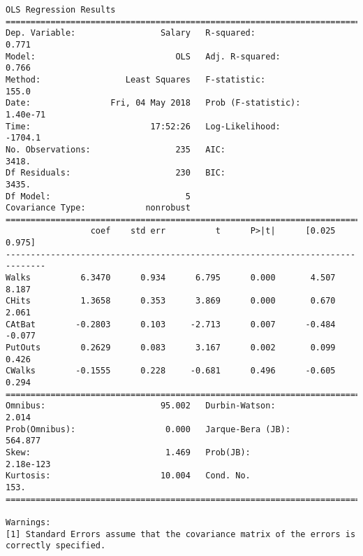 \documentclass[11pt]{article}
\begin{document}
    \begin{Verbatim}[commandchars=\\\{\}]
                            OLS Regression Results                            
==============================================================================
Dep. Variable:                 Salary   R-squared:                       0.771
Model:                            OLS   Adj. R-squared:                  0.766
Method:                 Least Squares   F-statistic:                     155.0
Date:                Fri, 04 May 2018   Prob (F-statistic):           1.40e-71
Time:                        17:52:26   Log-Likelihood:                -1704.1
No. Observations:                 235   AIC:                             3418.
Df Residuals:                     230   BIC:                             3435.
Df Model:                           5                                         
Covariance Type:            nonrobust                                         
==============================================================================
                 coef    std err          t      P>|t|      [0.025      0.975]
------------------------------------------------------------------------------
Walks          6.3470      0.934      6.795      0.000       4.507       8.187
CHits          1.3658      0.353      3.869      0.000       0.670       2.061
CAtBat        -0.2803      0.103     -2.713      0.007      -0.484      -0.077
PutOuts        0.2629      0.083      3.167      0.002       0.099       0.426
CWalks        -0.1555      0.228     -0.681      0.496      -0.605       0.294
==============================================================================
Omnibus:                       95.002   Durbin-Watson:                   2.014
Prob(Omnibus):                  0.000   Jarque-Bera (JB):              564.877
Skew:                           1.469   Prob(JB):                    2.18e-123
Kurtosis:                      10.004   Cond. No.                         153.
==============================================================================

Warnings:
[1] Standard Errors assume that the covariance matrix of the errors is correctly specified.

    \end{Verbatim}


    
    
    
    
\end{document}
